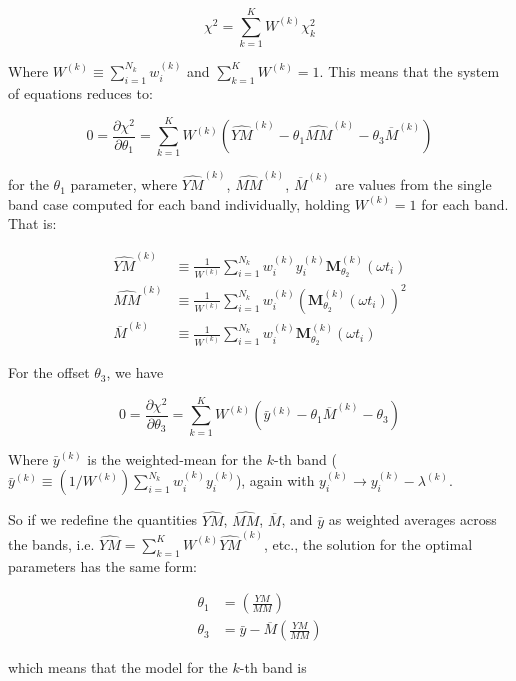 \documentclass{aastex62}
\newcommand{\MMhat}{\widehat{MM}}
\newcommand{\YMhat}{\widehat{YM}}
\newcommand{\Mbar}{\overline{M}}
\newcommand{\ybar}{\bar{y}}
\newcommand{\Mbk}[1][k]{\Mbar^{(#1)}}
\newcommand{\Mt}{\mathbf{M}}
\newcommand{\Mtshft}{\Mt_{\theta_2}}
\newcommand{\YMh}[1][k]{\YMhat^{(#1)}}
\newcommand{\MMh}[1][k]{\MMhat^{(#1)}}
\newcommand{\yb}[1][k]{\ybar^{(#1)}}
\newcommand{\wk}[1][k]{w^{(#1)}}
\newcommand{\yk}[1][k]{y^{(#1)}}
\newcommand{\Mtshftk}[1][k]{\Mtshft^{(#1)}}
\newcommand{\lk}[1][k]{\lambda^{(#1)}}
\newcommand{\Wtk}[1][k]{W^{(#1)}}
\begin{document}
\begin{appendix}
\begin{equation}
\chi^2 = \sum_{k=1}^K \Wtk\chi^2_k
\end{equation}

Where $\Wtk \equiv \sum_{i=1}^{N_k}\wk_i$ and $\sum_{k=1}^K\Wtk = 1$. This means that the system of equations reduces to:

\begin{equation}
0 = \frac{\partial\chi^2}{\partial\theta_1} = \sum_{k=1}^K \Wtk\left(\YMh - \theta_1\MMh - \theta_3\Mbk\right)
\end{equation}

for the $\theta_1$ parameter, where $\YMh$, $\MMh$, $\Mbk$ are values from the single band case computed for each band individually, holding $\Wtk = 1$ for each band. That is:

\begin{align}
\YMh &\equiv \frac{1}{\Wtk}\sum_{i=1}^{N_k}\wk_i \yk_i \Mtshftk(\omega t_i)\\
\MMh &\equiv \frac{1}{\Wtk}\sum_{i=1}^{N_k}\wk_i \left(\Mtshftk(\omega t_i)\right)^2\\
\Mbk &\equiv \frac{1}{\Wtk}\sum_{i=1}^{N_k}\wk_i \Mtshftk(\omega t_i)
\end{align}

For the offset $\theta_3$, we have

\begin{equation}
0 = \frac{\partial\chi^2}{\partial\theta_3} = \sum_{k=1}^K \Wtk\left(\yb - \theta_1\Mbk - \theta_3\right)
\end{equation}

Where $\yb$ is the weighted-mean for the $k$-th band ($\yb \equiv (1/\Wtk)\sum_{i=1}^{N_k}\wk_i\yk_i$), again with $\yk_i \rightarrow \yk_i - \lk$.

So if we redefine the quantities $\YMhat$, $\MMhat$, $\Mbar$, and $\bar{y}$ as weighted averages across the bands, i.e. $\YMhat = \sum_{k=1}^K \Wtk \YMh$, etc., the solution for the optimal parameters has the same form:

\begin{align}
\theta_1 &= \left(\frac{YM}{MM}\right)\\
\theta_3 &= \bar{y} - \Mbar\left(\frac{YM}{MM}\right)
\end{align}

which means that the model for the $k$-th band is


\end{appendix}
\end{document}
